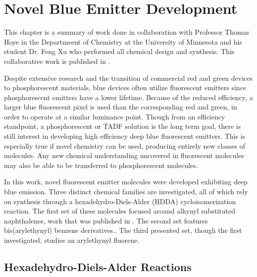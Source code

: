 \documentclass[../thesis.tex]{subfiles}
\begin{document}
\chapter{Novel Blue Emitter Development}\label{sec:hoye}

This chapter is a summary of work done in collaboration with Professor Thomas Hoye in the Departmeent of Chemistry at the University of Minnesota and his student Dr. Feng Xu who performed all chemical design and synthesis.
This collaborative work is published in \textcite{Xu2016}.


Despite extensive research and the transition of commercial red and green devices to phosphorescent materials, blue devices often utilize fluorescent emitters since phosphorescent emitters have a lower lifetime.\supercite{Scholz2015}
Because of the reduced efficiency, a larger blue fluorescent pixel is used than the corresponding red and green, in order to operate at a similar luminance point.\supercite{Mertens2013}
Though from an efficiency standpoint, a phosphorescent or TADF solution is the long term goal, there is still interest in developing high efficiency deep blue fluorescent emitters.\supercite{Lee2009b,Chi2010,Kim2008,Zhu2013,Lee2005}
This is especially true if novel chemistry can be used, producing entirely new classes of molecules.
Any new chemical understanding uncovered in fluorescent molecules may also be able to be transferred to phosphorescent molecules.

In this work, novel fluorescent emitter molecules were developed exhibiting deep blue emission.
Three distinct chemical families are investigated, all of which rely on synthesis through a hexadehydro-Diels-Alder (HDDA) cycloisomerization reaction.
The first set of these molecules focused around alkynyl substituted naphthalenes, work that was published in \textcite{Xu2016}.
The second set features  bis(arylethynyl) benzene derivatives..
The third presented set, though the first investigated, studies an arylethynyl fluorene.

\section{Hexadehydro-Diels-Alder Reactions}
\end{document}
